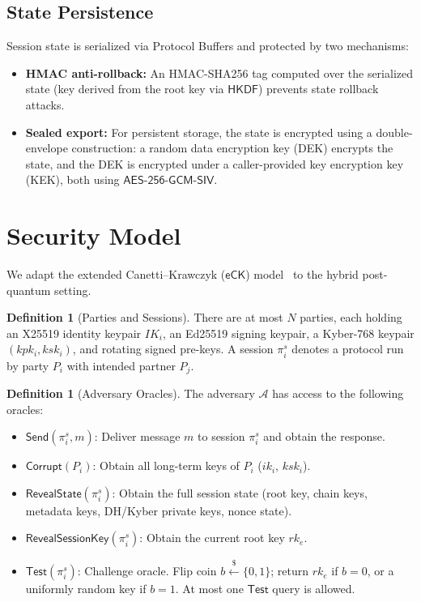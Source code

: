 \documentclass[11pt,a4paper]{article}
\theoremstyle{definition}
\newtheorem{definition}[theorem]{Definition}
\newcommand{\advA}{\mathcal{A}}
\newcommand{\HKDF}{\textsf{HKDF}}
\newcommand{\AEAD}{\textsf{AES-256-GCM-SIV}}
\newcommand{\eCK}{\textsf{eCK}}
\newcommand{\getsr}{\stackrel{\$}{\gets}}
\newcommand{\rk}{\mathit{rk}}
\newcommand{\IK}{\mathit{IK}}
\begin{document}
\subsection{State Persistence}\label{sec:state}

Session state is serialized via Protocol Buffers and protected by two mechanisms:
\begin{itemize}
  \item \textbf{HMAC anti-rollback:} An HMAC-SHA256 tag computed over the serialized state (key derived from the root key via $\HKDF$) prevents state rollback attacks.
  \item \textbf{Sealed export:} For persistent storage, the state is encrypted using a double-envelope construction: a random data encryption key (DEK) encrypts the state, and the DEK is encrypted under a caller-provided key encryption key (KEK), both using $\AEAD$.
\end{itemize}


\section{Security Model}\label{sec:security-model}

We adapt the extended Canetti--Krawczyk ($\eCK$) model~\cite{canetti2001,lamacchia2007} to the hybrid post-quantum setting.

\begin{definition}[Parties and Sessions]\label{def:parties}
There are at most $N$ parties, each holding an X25519 identity keypair $\IK_i$, an Ed25519 signing keypair, a Kyber-768 keypair $(kpk_i, ksk_i)$, and rotating signed pre-keys. A session $\pi_i^s$ denotes a protocol run by party $P_i$ with intended partner $P_j$.
\end{definition}

\begin{definition}[Adversary Oracles]\label{def:oracles}
The adversary $\advA$ has access to the following oracles:
\begin{itemize}
  \item $\textsf{Send}(\pi_i^s, m)$: Deliver message $m$ to session $\pi_i^s$ and obtain the response.
  \item $\textsf{Corrupt}(P_i)$: Obtain all long-term keys of $P_i$ ($\mathit{ik}_i$, $ksk_i$).
  \item $\textsf{RevealState}(\pi_i^s)$: Obtain the full session state (root key, chain keys, metadata keys, DH/Kyber private keys, nonce state).
  \item $\textsf{RevealSessionKey}(\pi_i^s)$: Obtain the current root key $\rk_e$.
  \item $\textsf{Test}(\pi_i^s)$: Challenge oracle. Flip coin $b \getsr \{0,1\}$; return $\rk_e$ if $b = 0$, or a uniformly random key if $b = 1$. At most one $\textsf{Test}$ query is allowed.
\end{itemize}
\end{definition}
\end{document}
